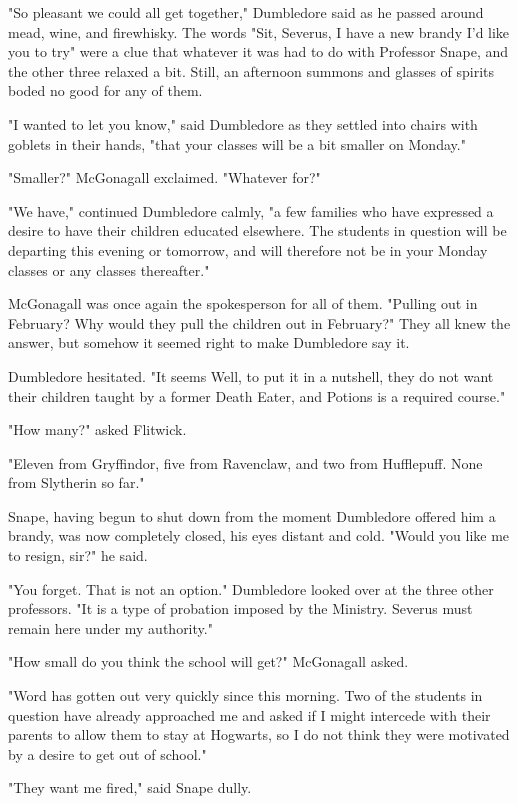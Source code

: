 "So pleasant we could all get together," Dumbledore said as he passed around mead, wine, and firewhisky. The words "Sit, Severus, I have a new brandy I'd like you to try{\el}" were a clue that whatever it was had to do with Professor Snape, and the other three relaxed a bit. Still, an afternoon summons and glasses of spirits boded no good for any of them.

"I wanted to let you know," said Dumbledore as they settled into chairs with goblets in their hands, "that your classes will be a bit smaller on Monday."

"Smaller?" McGonagall exclaimed. "Whatever for?"

"We have," continued Dumbledore calmly, "a few families who have expressed a desire to have their children educated elsewhere. The students in question will be departing this evening or tomorrow, and will therefore not be in your Monday classes or any classes thereafter."

McGonagall was once again the spokesperson for all of them. "Pulling out in February? Why would they pull the children out in February?" They all knew the answer, but somehow it seemed right to make Dumbledore say it.

Dumbledore hesitated. "It seems{\el} Well, to put it in a nutshell, they do not want their children taught by a former Death Eater, and Potions is a required course."

"How many?" asked Flitwick.

"Eleven from Gryffindor, five from Ravenclaw, and two from Hufflepuff. None from Slytherin so far."

Snape, having begun to shut down from the moment Dumbledore offered him a brandy, was now completely closed, his eyes distant and cold. "Would you like me to resign, sir?" he said.

"You forget. That is not an option." Dumbledore looked over at the three other professors. "It is a type of probation imposed by the Ministry. Severus must remain here under my authority."

"How small do you think the school will get?" McGonagall asked.

"Word has gotten out very quickly since this morning. Two of the students in question have already approached me and asked if I might intercede with their parents to allow them to stay at Hogwarts, so I do not think they were motivated by a desire to get out of school."

"They want me fired," said Snape dully.

